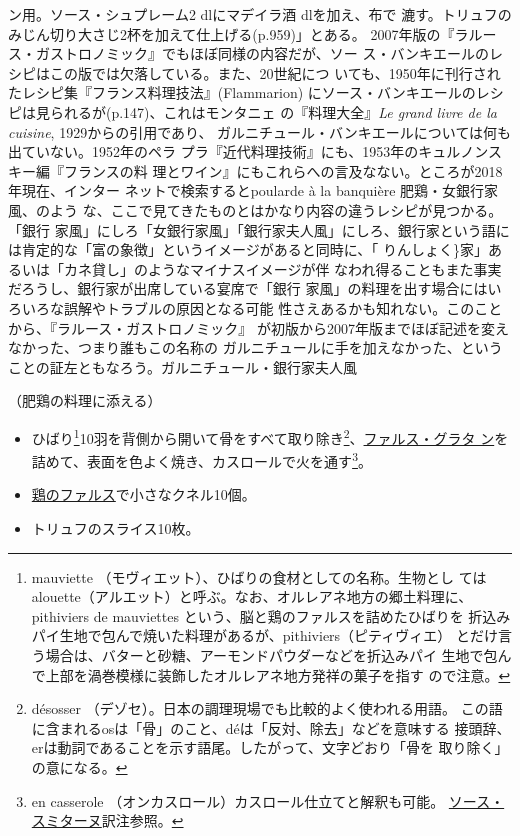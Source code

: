 \begin{recette}
{{{{  ン用。ソース・シュプレーム2 dlにマデイラ酒\undemi{} dlを加え、布で
  漉す。トリュフのみじん切り大さじ2杯を加えて仕上げる(p.959)」とある。
  2007年版の『ラルース・ガストロノミック』でもほぼ同様の内容だが、ソー
  ス・バンキエールのレシピはこの版では欠落している。また、20世紀につ
  いても、1950年に刊行されたレシピ集『フランス料理技法』(Flammarion)
  にソース・バンキエールのレシピは見られるが(p.147)、これはモンタニェ
  の『料理大全』\emph{Le grand livre de la cuisine},
  1929からの引用であり、
  ガルニチュール・バンキエールについては何も出ていない。1952年のペラ
  プラ『近代料理技術』にも、1953年のキュルノンスキー編『フランスの料
  理とワイン』にもこれらへの言及なない。ところが2018年現在、インター
  ネットで検索するとpoularde à la banquière 肥鶏・女銀行家風、のよう
  な、ここで見てきたものとはかなり内容の違うレシピが見つかる。「銀行
  家風」にしろ「女銀行家風」「銀行家夫人風」にしろ、銀行家という語に
  は肯定的な「富の象徴」というイメージがあると同時に、「
  {りんしょく}\}家」あるいは「カネ貸し」のようなマイナスイメージが伴
  なわれ得ることもまた事実だろうし、銀行家が出席している宴席で「銀行
  家風」の料理を出す場合にはいろいろな誤解やトラブルの原因となる可能
  性さえあるかも知れない。このことから、『ラルース・ガストロノミック』
  が初版から2007年版までほぼ記述を変えなかった、つまり誰もこの名称の
  ガルニチュールに手を加えなかった、ということの証左ともなろう。}}{ガルニチュール・銀行家夫人風}}\label{garniture-banquiere}}



（肥鶏の料理に添える）

\begin{itemize}
\item
  ひばり\footnote{mauviette
    （モヴィエット）、ひばりの食材としての名称。生物とし
    てはalouette（アルエット）と呼ぶ。なお、オルレアネ地方の郷土料理に、
    pithiviers de mauviettes という、脳と鶏のファルスを詰めたひばりを
    折込みパイ生地で包んで焼いた料理があるが、pithiviers（ピティヴィエ）
    とだけ言う場合は、バターと砂糖、アーモンドパウダーなどを折込みパイ
    生地で包んで上部を渦巻模様に装飾したオルレアネ地方発祥の菓子を指す
    ので注意。}10羽を背側から開いて骨をすべて取り除き\footnote{désosser
    （デゾセ）。日本の調理現場でも比較的よく使われる用語。
    この語に含まれるosは「骨」のこと、déは「反対、除去」などを意味する
    接頭辞、erは動詞であることを示す語尾。したがって、文字どおり「骨を
    取り除く」の意になる。}、\protect\hyperlink{farce-gratin-c}{ファルス・グラタ
  ン}を詰めて、表面を色よく焼き、カスロールで火を通す\footnote{en
    casserole （オンカスロール）カスロール仕立てと解釈も可能。
    \protect\hyperlink{sauce-smitane}{ソース・スミターヌ}訳注参照。}。
\item
  \protect\hyperlink{farce-b}{鶏のファルス}で小さなクネル10個。
\item
  トリュフのスライス10枚。
\end{itemize}


\end{recette}
